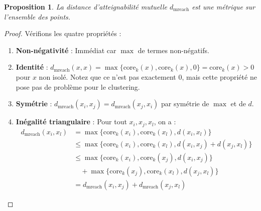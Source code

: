 \documentclass[11pt,a4paper]{article}
\newtheorem{proposition}[definition]{Proposition}
\begin{document}
\begin{proposition}
La distance d'atteignabilité mutuelle $d_{\text{mreach}}$ est une métrique sur l'ensemble des points.
\end{proposition}

\begin{proof}
Vérifions les quatre propriétés :
\begin{enumerate}
    \item \textbf{Non-négativité} : Immédiat car $\max$ de termes non-négatifs.
    \item \textbf{Identité} : $d_{\text{mreach}}(x, x) = \max\{\text{core}_k(x), \text{core}_k(x), 0\} = \text{core}_k(x) > 0$ pour $x$ non isolé. Notez que ce n'est pas exactement $0$, mais cette propriété ne pose pas de problème pour le clustering.
    \item \textbf{Symétrie} : $d_{\text{mreach}}(x_i, x_j) = d_{\text{mreach}}(x_j, x_i)$ par symétrie de $\max$ et de $d$.
    \item \textbf{Inégalité triangulaire} : Pour tout $x_i, x_j, x_l$, on a :
    \begin{align}
    d_{\text{mreach}}(x_i, x_l) &= \max\{\text{core}_k(x_i), \text{core}_k(x_l), d(x_i, x_l)\} \\
    &\leq \max\{\text{core}_k(x_i), \text{core}_k(x_l), d(x_i, x_j) + d(x_j, x_l)\} \\
    &\leq \max\{\text{core}_k(x_i), \text{core}_k(x_j), d(x_i, x_j)\} \nonumber\\
    &\quad + \max\{\text{core}_k(x_j), \text{core}_k(x_l), d(x_j, x_l)\} \\
    &= d_{\text{mreach}}(x_i, x_j) + d_{\text{mreach}}(x_j, x_l)
    \end{align}
\end{enumerate}
\end{proof}
\end{document}
